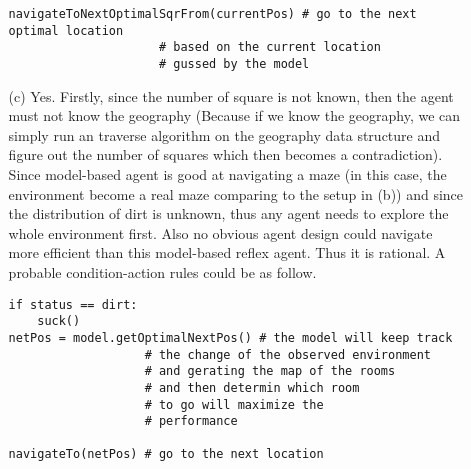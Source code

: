 \documentclass[12pt]{article}
\begin{document}
\begin{singlespace}
\begin{enumerate}
\begin{itemize}
\begin{lstlisting}[basicstyle=\ttfamily\scriptsize]
navigateToNextOptimalSqrFrom(currentPos) # go to the next optimal location 
					 # based on the current location
					 # gussed by the model
	\end{lstlisting}
	\item[(c)] Yes. Firstly, since the number of square is not known, then the agent must not know the geography (Because if we know the geography, we can simply run an traverse algorithm on the geography data structure and figure out the number of squares which then becomes a contradiction). Since model-based agent is good at navigating a maze (in this case, the environment become a real maze comparing to the setup in (b)) and since the distribution of dirt is unknown, thus any agent needs to explore the whole environment first. Also no obvious agent design could navigate more efficient than this model-based reflex agent. Thus it is rational. A probable condition-action rules could be as follow.
	\begin{lstlisting}[basicstyle=\ttfamily\scriptsize]
if status == dirt:
	suck()
netPos = model.getOptimalNextPos() # the model will keep track
				   # the change of the observed environment
				   # and gerating the map of the rooms
				   # and then determin which room 
				   # to go will maximize the 
				   # performance

navigateTo(netPos) # go to the next location
	\end{lstlisting}
	\end{itemize}


\end{enumerate}
\end{singlespace}
\end{document}
